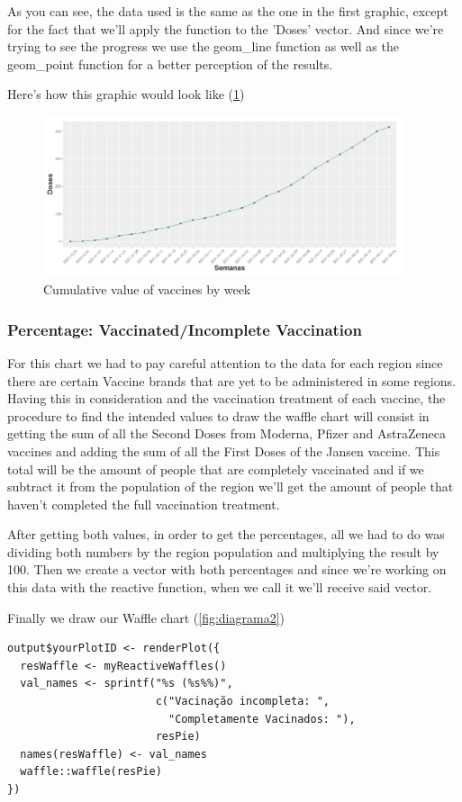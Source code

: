 As you can see, the data used is the same as the one in the first graphic, except for the fact that we'll apply the function to the 'Doses' vector.
And since we're trying to see the progress we use the geom\_line function as well as the geom\_point function for a better perception of the results.


Here's how this graphic would look like (\ref{fig:diagrama1})
\begin{figure}[H]
\centering
\includegraphics[width=300pt,trim=10 0 0 -10mm]{images/grafico2novo.png}
\caption{Cumulative value of vaccines by week}
\label{fig:diagrama1}
\end{figure}

\subsubsection{Percentage: Vaccinated/Incomplete Vaccination}

For this chart we had to pay careful attention to the data for each region since there are certain Vaccine brands that are yet to be administered in some regions. Having this in consideration and the vaccination treatment of each vaccine, the procedure to find the intended values to draw the waffle chart will consist in getting the sum of all the Second Doses from Moderna, Pfizer and AstraZeneca vaccines and adding the sum of all the First Doses of the Jansen vaccine. This total will be the amount of people that are completely vaccinated and if we subtract it from the population of the region we'll get the amount of people that haven't completed the full vaccination treatment.

After getting both values, in order to get the percentages, all we had to do was dividing both numbers by the region population and multiplying the result by 100. Then we create a vector with both percentages and since we're working on this data with the reactive function, when we call it we'll receive said vector.

Finally we draw our Waffle chart (\ref{fig:diagrama2})
\begin{verbatim}
output$yourPlotID <- renderPlot({
  resWaffle <- myReactiveWaffles()
  val_names <- sprintf("%s (%s%%)", 
                       c("Vacinação incompleta: ", 
                         "Completamente Vacinados: "), 
                       resPie)
  names(resWaffle) <- val_names
  waffle::waffle(resPie)
})
\end{verbatim}

